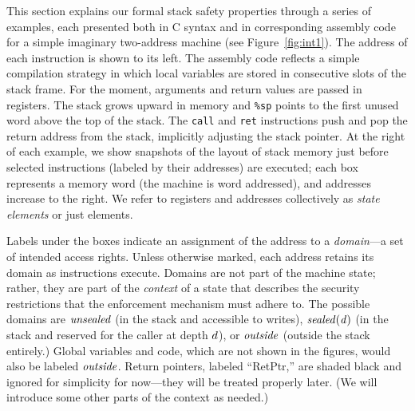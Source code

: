 \documentclass[10pt,conference]{ieeetran}%
\theoremstyle{definition}
\begin{document}
\addtolength{\abovecaptionskip}{-1em}


This section explains our formal stack safety properties through a series
of examples, each presented both in C syntax and in corresponding assembly code for a
simple imaginary two-address machine (see Figure~\ref{fig:int1}).
The address of each instruction is shown to its left.
The assembly code reflects a simple compilation strategy in which
local variables are stored in consecutive slots of the stack frame.
For the moment, arguments and return values are passed in registers.
The stack grows upward in
memory and {\tt \%sp} points to the first unused word above the top of the stack.
The {\tt call} and {\tt ret} instructions push and pop the return address from the stack,
implicitly adjusting the stack pointer.
At the right of each example, we show snapshots of the layout of stack memory just before
selected instructions (labeled by their addresses) are executed; each box represents a memory word
(the machine is word addressed), and addresses increase to the right.
We refer to registers and addresses collectively as {\em state elements} or just elements.

Labels under the boxes indicate an assignment of the address to a
{\em domain}---a set of intended access
rights. Unless otherwise marked, each address retains its domain as
instructions execute. %
Domains are not part of the machine state; rather, they are part
of the {\em context} of a state that describes the security restrictions
that the enforcement mechanism must adhere to.
The possible domains
are \(\mathit{unsealed}\) (in the stack and accessible to writes), \(\mathit{sealed(d)}\)
(in the stack and reserved for the caller at depth \(d\)), or \(\mathit{outside}\)
(outside the stack entirely.)
Global variables and code, which are not shown in the figures, would
also be labeled \(\mathit{outside}\). Return pointers, labeled ``RetPtr,''
are shaded black and ignored for simplicity for now---they will
be treated properly later.
(We will introduce some other parts of the context as needed.)
\end{document}
